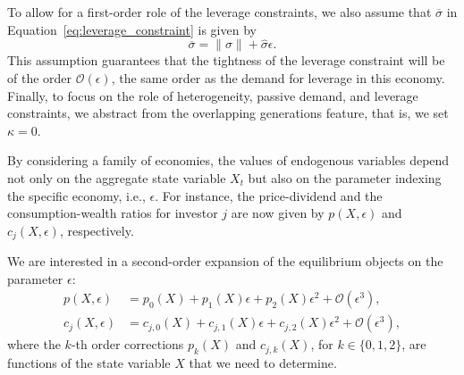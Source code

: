 To allow for a first-order role of the leverage constraints, we also assume that $\overline{\sigma}$ in Equation~\eqref{eq:leverage_constraint} is given by
\begin{equation}\label{eq:sig_bar-perturb}
    \overline{\sigma} = \|\sigma\| + \hat{\sigma} \epsilon.
\end{equation}
This assumption guarantees that the tightness of the leverage constraint will be of the order $\mathcal{O}(\epsilon)$, the same order as the demand for leverage in this economy. 
Finally, to focus on the role of heterogeneity, passive demand, and leverage constraints, we abstract from the overlapping generations feature, that is, we set $\kappa = 0$. 

By considering a family of economies, the values of endogenous variables depend not only on the aggregate state variable $X_t$ but also on the parameter indexing the specific economy, i.e., $\epsilon$. For instance, the price-dividend and the consumption-wealth ratios for investor $j$ are now given by $p(X,\epsilon)$ and  $c_j(X,\epsilon)$, respectively. 

We are interested in a second-order expansion of the equilibrium objects on the parameter $\epsilon$:
\begin{align}
    p(X,\epsilon) &= p_{0}(X) + p_{1}(X) \epsilon + p_{2}(X) \epsilon^2 + \mathcal{O}(\epsilon^3), \\
    c_{j}(X,\epsilon) &= c_{j,0}(X) + c_{j,1}(X) \epsilon + c_{j,2}(X) \epsilon^2 + \mathcal{O}(\epsilon^3),
\end{align}
where the $k$-th order corrections $p_k(X)$ and $c_{j,k}(X)$, for $k\in\{0,1,2\}$, are functions of the state variable $X$ that we need to determine.%

